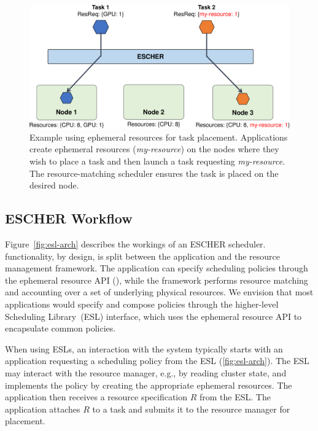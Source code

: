 \begin{figure}[t]
    \centering
    \includegraphics[width=0.82\linewidth]{escher/figures/logicalres_demo.pdf}
    \caption{\small Example using ephemeral resources for task placement. Applications create ephemeral resources (\emph{my-resource}) on the nodes where they wish to place a task and then launch a task requesting \emph{my-resource}. The resource-matching scheduler ensures the task is placed on the desired node.}
    \label{fig:er-example}
\end{figure}

\subsection{ESCHER Workflow}
\label{sec:arch:design}

Figure~\ref{fig:esl-arch} describes the workings of an ESCHER scheduler. %
\name{} functionality, by design, is split between the application and the resource management framework.
The application can specify scheduling policies through the ephemeral resource API (), while the framework performs resource matching and accounting over a set of underlying physical resources.
We envision that most applications would specify and compose policies through the higher-level \name{} Scheduling Library~(ESL) interface, which uses the ephemeral resource API to encapsulate common policies.

When using ESLs, an interaction with the system typically starts with an application requesting a scheduling policy from the ESL (\cref{fig:esl-arch}).
The ESL may interact with the resource manager, e.g., by reading cluster state, and implements the policy by creating the appropriate ephemeral resources.
The application then receives a resource specification $R$ from the ESL.
The application attaches $R$ to a task and submits it to the resource manager for placement.

